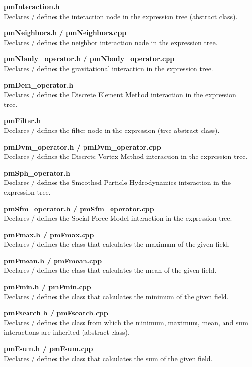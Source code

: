 \documentclass[a4paper,12pt,openany]{book}
\theoremstyle{break}
\begin{document}
\textbf{pmInteraction.h} \\
Declares / defines the interaction node in the expression tree (abstract class).

\textbf{pmNeighbors.h / pmNeighbors.cpp} \\
Declares / defines the neighbor interaction node in the expression tree.

\textbf{pmNbody\_operator.h / pmNbody\_operator.cpp} \\
Declares / defines the gravitational interaction in the expression tree.

\textbf{pmDem\_operator.h} \\
Declares / defines the Discrete Element Method interaction in the expression tree.

\textbf{pmFilter.h} \\
Declares / defines the filter node in the expression (tree abstract class).

\textbf{pmDvm\_operator.h / pmDvm\_operator.cpp} \\
Declares / defines the Discrete Vortex Method interaction in the expression tree.

\textbf{pmSph\_operator.h} \\
Declares / defines the Smoothed Particle Hydrodynamics interaction in the expression tree.

\textbf{pmSfm\_operator.h / pmSfm\_operator.cpp} \\
Declares / defines the Social Force Model interaction in the expression tree.

\textbf{pmFmax.h / pmFmax.cpp} \\
Declares / defines the class that calculates the maximum of the given field.

\textbf{pmFmean.h / pmFmean.cpp} \\
Declares / defines the class that calculates the mean of the given field.

\textbf{pmFmin.h / pmFmin.cpp} \\
Declares / defines the class that calculates the minimum of the given field.

\textbf{pmFsearch.h / pmFsearch.cpp} \\
Declares / defines the class from which the minimum, maximum, mean, and sum interactions are inherited (abstract class).

\textbf{pmFsum.h / pmFsum.cpp} \\
Declares / defines the class that calculates the sum of the given field.
\end{document}
